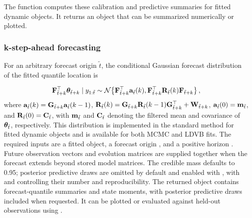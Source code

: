 The function  computes these calibration and predictive summaries for fitted dynamic objects. It returns an  object that can be summarized numerically or plotted.

\subsubsection{k-step-ahead forecasting}

For an arbitrary forecast origin \(\tilde t\), the conditional Gaussian
forecast distribution of the fitted quantile location is

\begin{equation}
\mathbf{F}_{\tilde{t}+k}^\top \boldsymbol{\theta}_{\tilde{t}+k}\mid y_{1:\tilde t}
\sim \mathcal{N}\!\left\{\mathbf{F}_{\tilde{t}+k}^\top \mathbf{a}_{\tilde{t}}(k),
\mathbf{F}_{\tilde{t}+k}^\top\mathbf{R}_{\tilde{t}}(k)\mathbf{F}_{\tilde{t}+k}\right\},
\label{exd:eq:forecast_recursion}
\end{equation}
where $\mathbf{a}_{\tilde{t}}(k) = \mathbf{G}_{\tilde{t}+k} \mathbf{a}_{\tilde{t}}(k-1)$, $\mathbf{R}_{\tilde{t}}(k) = \mathbf{G}_{\tilde{t}+k} \mathbf{R}_{\tilde{t}}(k-1) \mathbf{G}_{\tilde{t}+k}^\top + \mathbf{W}_{\tilde{t}+k}$, $\mathbf{a}_{\tilde{t}}(0) = \mathbf{m}_{\tilde{t}}$, and $\mathbf{R}_{\tilde{t}}(0) = \mathbf{C}_{\tilde{t}}$, with $\mathbf{m}_{\tilde{t}}$ and $\mathbf{C}_{\tilde{t}}$ denoting the filtered mean and covariance of $\boldsymbol{\theta}_{\tilde{t}}$, respectively. This distribution is implemented in the standard  method for fitted dynamic objects and is available for both MCMC and LDVB fits. The required inputs are a fitted object, a forecast origin , and a positive horizon . Future observation vectors  and evolution matrices  are supplied together when the forecast extends beyond stored model matrices. The credible mass  defaults to 0.95; posterior predictive draws are omitted by default and enabled with , with  and  controlling their number and reproducibility. The returned  object contains forecast-quantile summaries and state moments, with posterior predictive draws included when requested. It can be plotted or evaluated against held-out observations using .



